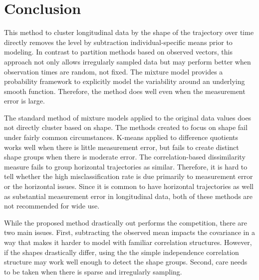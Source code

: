 \documentclass[12pt]{article}
\begin{document}
\section{Conclusion}
This method to cluster longitudinal data by the shape of the trajectory over time directly removes the level by subtraction individual-specific means prior to modeling. In contrast to partition methods based on observed vectors, this approach not only allows irregularly sampled data but may perform better when observation times are random, not fixed. The mixture model provides a probability framework to explicitly model the variability around an underlying smooth function. Therefore, the method does well even when the measurement error is large. 

The standard method of mixture models applied to the original data values does not directly cluster based on shape. The methods created to focus on shape fail under fairly common circumstances. K-means applied to difference quotients works well when there is little measurement error, but fails to create distinct shape groups when there is moderate error. The correlation-based dissimilarity measure fails to group horizontal trajectories as similar. Therefore, it is hard to tell whether the high misclassification rate is due primarily to measurement error or the horizontal issues. Since it is common to have horizontal trajectories as well as substantial measurement error in longitudinal data, both of these methods are not recommended for wide use. 

While the proposed method drastically out performs the competition, there are two main issues. First, subtracting the observed mean impacts the covariance in a way that makes it harder to model with familiar correlation structures. However, if the shapes drastically differ, using the the simple independence correlation structure may work well enough to detect the shape groups. Second, care needs to be taken when there is sparse and irregularly sampling. 

\printbibliography
\end{document}
